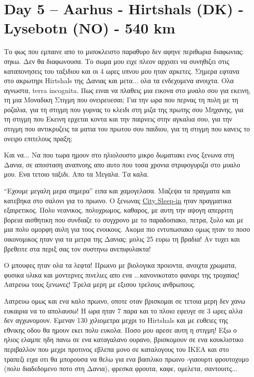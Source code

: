 \chapter{Day 5 -- Aarhus - Hirtshals (DK) - Lysebotn (NO) - 540 km}

Το φως που εμπαινε απο το μισοκλειστο παραθυρο δεν αφηνε περιθωρια διαφωνιας: σηκω.
Δεν θα διαφωνουσα. Το σωμα μου ειχε πλεον αρχισει να συνηθιζει στις καταπονησεις του ταξιδιου και οι 4 ωρες υπνου μου ηταν αρκετες.
Σημερα εφτανα στο ακρωτηρι Hirtshals της Δανιας και μετα... ολα τα ενδεχομενα ανοιχτα. Ολα αγνωστα, terra incognita.
Πως ειναι να πλαθεις μια εικονα στο μυαλο σου για εκεινη, τη μια Μοναδικη Στιγμη που ονειρευεσαι; Για την ωρα που περνας τη πυλη με τη ροζαλια, για τη στιγμη που γυρνας το κλειδι στη μιζα της πρωτης σου Μηχανης, για τη στιγμη που Εκεινη ερχεται κοντα και την παιρνεις στην αγκαλια σου, για την στιγμη που αντικρυζεις τα ματια του πρωτου σου παιδιου, για τη στιγμη που κανεις το ονειρο επιτελους πραξη;

Και να... Να που τωρα ημουν στο ηλιολουστο μικρο δωματιακι ενος ξενωνα στη Δανια, σε αποσταση αναπνοης απο αυτο που τοσα χρονια στριφογυριζα στο μυαλο μου. Ενα τετοιο ταξιδι. Απο τα Μεγαλα. Τα καλα.


``Εχουμε μεγαλη μερα σημερα'' ειπα και χαμογελασα. Μαζεψα τα πραγματα και κατεβηκα στο σαλονι για το πρωινο. 
Ο ξενωνας \href{http://www.citysleep-in.dk/}{City Sleep-in} ηταν πραγματικα εξαιρετικος. Πολυ νεανικος, πολυχρωμος, καθαρος, με αυτη την αψογη απερριτη βορεια αισθητικη που συνδιαζε το συγχρονο με το παραδοσιακο, πετρα, ξυλο και με μια πολυ ομορφη αυλη για τους ενοικους. 
Ακομα πιο εντυπωσιακο ομως ηταν το ποσο οικονομικος ηταν για τα μετρα της Δανιας: μολις 25 ευρω τη βραδια! 
Αν τυχει και βρεθειτε στα περιξ σας τον συστηνω ανεπιφυλακτα!


Ο μπουφες ηταν ολα τα λεφτα! Πρωινο με βιολογικα προιοντα, ανοιχτα χρωματα, φυσικα υλικα και μοντερνες πινελιες απο ενα ...κανονικοτατο φαναρι της τροχαιας! Λατρευω τους ξενωνες! Τρελα μερη με εξισου τρελους ανθρωπους.


Λατρευω ομως και ενα καλο πρωινο, οποτε οταν βρισκομαι σε τετοια μερη δεν χανω ευκαιρια να το απολαυσω! 
Η ωρα ηταν 7 παρα και το πλοιο εφευγε σε 3 ωρες αλλα δεν αγχωνομουν. Εμεναν 130 χιλιομετρα μεχρι το Hirtshals και με ευθειες της εθνικης οδου θα ημουν εκει πολυ ευκολα. 
Ποσο μου αρεσε αυτη η στιγμη! Εξω ο ηλιος ελαμπε ηδη πανω σε ενα καταγαλανο ουρανο, βρισκομουν σε ενα κουκλιστικο περιβαλλον που μεχρι προτινος εβλεπα μονο σε καταλογους του ΙΚΕΑ και στο τραπεζι ειχα οτι θα μπορουσα να θελω για ενα βασιλικο πρωινο -γιαουρτι φρουτοχυμο (πολυ διαδεδομενο ποτο στη Δανια), φρεσκα φρουτα, καφε, ομελετα, σαντουιτς...

